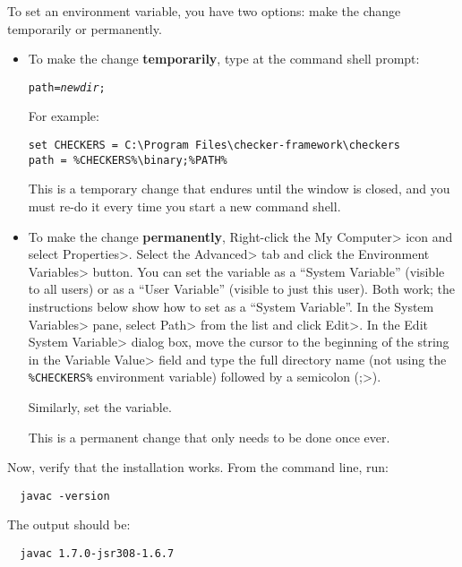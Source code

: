 \begin{enumerate}
To set an environment variable, you have two options:  make the change
temporarily or permanently.
\begin{itemize}
\item
To make the change \textbf{temporarily}, type at the command shell prompt:

\begin{alltt}
path = \emph{newdir};%PATH%
\end{alltt}

For example:

\begin{Verbatim}
set CHECKERS = C:\Program Files\checker-framework\checkers
path = %CHECKERS%\binary;%PATH%
\end{Verbatim}

This is a temporary change that endures until the window is closed, and you
must re-do it every time you start a new command shell.

\item
To make the change \textbf{permanently},
Right-click the \<My Computer> icon and
select \<Properties>. Select the \<Advanced> tab and click the
\<Environment Variables> button. You can set the variable as a ``System
Variable'' (visible to all users) or as a ``User Variable'' (visible to
just this user).  Both work; the instructions below show how to set as a
``System Variable''.
In the \<System Variables> pane, select
\<Path> from the list and click \<Edit>. In the \<Edit System Variable>
dialog box, move the cursor to the beginning of the string in the
\<Variable Value> field and type the full directory name (not using the
\verb|%CHECKERS%| environment variable) followed by a
semicolon (\<;>).

Similarly, set the  variable.

This is a permanent change that only needs to be done once ever.
\end{itemize}



Now, verify that the installation works.  From the command line, run:

\begin{Verbatim}
  javac -version
\end{Verbatim}

The output should be:

\begin{Verbatim}
  javac 1.7.0-jsr308-1.6.7
\end{Verbatim}

\end{enumerate}



